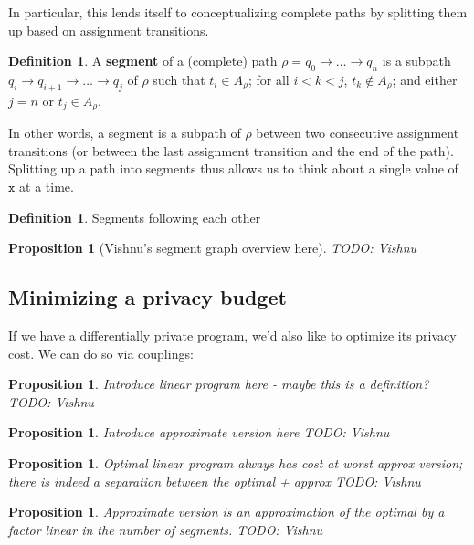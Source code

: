 \documentclass[12pt]{article}
\newtheorem{prop}[thm]{Proposition}
\theoremstyle{definition}
\newtheorem{defn}[thm]{Definition}
\begin{document}
In particular, this lends itself to conceptualizing complete paths by splitting them up based on assignment transitions. 

\begin{defn}
    A \textbf{segment} of a (complete) path $\rho = q_0\to\ldots\to q_n$ is a subpath $q_i \to q_{i+1}\to \ldots \to q_j$ of $\rho$ such that $t_i \in A_\rho$; for all $i<k<j$, $t_k \notin A_\rho$; and either $j=n$ or $t_j \in A_\rho$.
\end{defn}

In other words, a segment is a subpath of $\rho$ between two consecutive assignment transitions (or between the last assignment transition and the end of the path). Splitting up a path into segments thus allows us to think about a single value of $\texttt{x}$ at a time.

\begin{defn}
    Segments following each other
\end{defn}

\begin{prop}
    [Vishnu's segment graph overview here] TODO: Vishnu
\end{prop}

\subsection{Minimizing a privacy budget}

If we have a differentially private program, we'd also like to optimize its privacy cost. We can do so via couplings: 

\begin{prop}
    Introduce linear program here - maybe this is a definition?
    TODO: Vishnu
\end{prop}

\begin{prop}
    Introduce approximate version here
    TODO: Vishnu
\end{prop}

\begin{prop}
    Optimal linear program always has cost at worst approx version; there is indeed a separation between the optimal + approx
    TODO: Vishnu
\end{prop}

\begin{prop}
    Approximate version is an approximation of the optimal by a factor linear in the number of segments. 
    TODO: Vishnu
\end{prop}
\end{document}
